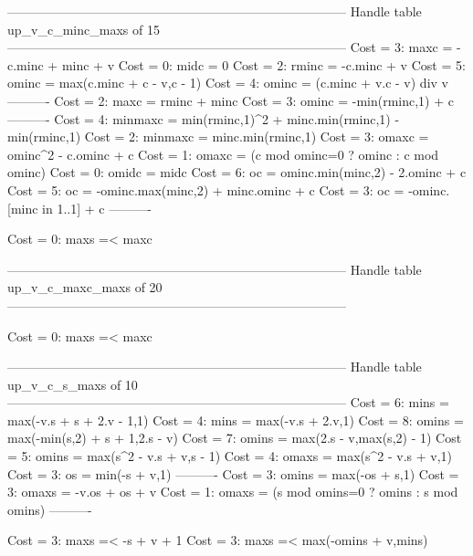 --------------------------------------------------------------------------------
Handle table up_v_c_minc_maxs of 15
--------------------------------------------------------------------------------
Cost =  3:  maxc    = -c.minc + minc + v
Cost =  0:  midc    = 0
Cost =  2:  rminc   = -c.minc + v
Cost =  5:  ominc   = max(c.minc + c - v,c - 1)
Cost =  4:  ominc   = (c.minc + v.c - v) div v
----------
Cost =  2:  maxc    = rminc + minc
Cost =  3:  ominc   = -min(rminc,1) + c
----------
Cost =  4:  minmaxc = min(rminc,1)^2 + minc.min(rminc,1) - min(rminc,1)
Cost =  2:  minmaxc = minc.min(rminc,1)
Cost =  3:  omaxc   = ominc^2 - c.ominc + c
Cost =  1:  omaxc   = (c mod ominc=0 ? ominc : c mod ominc)
Cost =  0:  omidc   = midc
Cost =  6:  oc      = ominc.min(minc,2) - 2.ominc + c
Cost =  5:  oc      = -ominc.max(minc,2) + minc.ominc + c
Cost =  3:  oc      = -ominc.[minc in 1..1] + c
----------

Cost =  0:  maxs =< maxc

--------------------------------------------------------------------------------
Handle table up_v_c_maxc_maxs of 20
--------------------------------------------------------------------------------

Cost =  0:  maxs =< maxc

--------------------------------------------------------------------------------
Handle table up_v_c_s_maxs of 10
--------------------------------------------------------------------------------
Cost =  6:  mins  = max(-v.s + s + 2.v - 1,1)
Cost =  4:  mins  = max(-v.s + 2.v,1)
Cost =  8:  omins = max(-min(s,2) + s + 1,2.s - v)
Cost =  7:  omins = max(2.s - v,max(s,2) - 1)
Cost =  5:  omins = max(s^2 - v.s + v,s - 1)
Cost =  4:  omaxs = max(s^2 - v.s + v,1)
Cost =  3:  os    = min(-s + v,1)
----------
Cost =  3:  omins = max(-os + s,1)
Cost =  3:  omaxs = -v.os + os + v
Cost =  1:  omaxs = (s mod omins=0 ? omins : s mod omins)
----------

Cost =  3:  maxs =< -s + v + 1
Cost =  3:  maxs =< max(-omins + v,mins)

